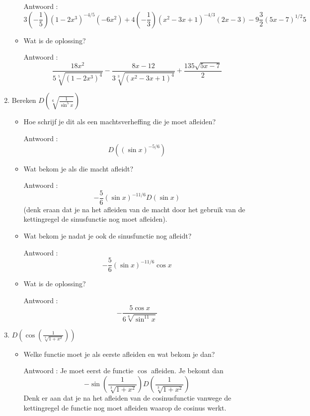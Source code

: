 \begin{enumerate}
\begin{itemize}
		Antwoord : \[3\left(- \frac{1}{5} \right)\left( 1-2x^3  \right)^{-4/5}\left( -6x^2  \right)+4\left( -\frac{1}{3}  \right)\left( x^2-3x+1  \right)^{-4/3}\left(2 x-3  \right)-9\frac{3}{2}\left( 5x-7  \right)^{1/2}5\]
		
		\item Wat is de oplossing?
		
		Antwoord : \[\frac{18x^2}{5\sqrt[5]{\left( 1-2x^3 \right) ^4}}-\frac{8x-12}{3\sqrt[3]{\left( x^2-3x+1 \right)^4}}+\frac{135 \sqrt{5x-7}}{2}\]
		
	\end{itemize}
	
	\item Bereken $D \left( \sqrt[6]{\frac{1}{\sin ^5x}}  \right)$
	
	\begin{itemize}
		
		\item Hoe schrijf je dit als een machtsverheffing die je moet afleiden?
		
		Antwoord : \[D \left( (\sin x)^{-5/6}  \right)\]
		
		\item Wat bekom je als die macht afleidt? 
		
		Antwoord : \[-\frac{5}{6} (\sin x)^{-11/6} D(\sin x)\] (denk eraan dat je na het afleiden van de macht door het gebruik van de kettingregel de sinusfunctie nog moet afleiden).
		
		\item Wat bekom je nadat je ook de sinusfunctie nog afleidt?
		
		Antwoord : \[-\frac{5}{6} (\sin x)^{-11/6} \cos x\]
		
		\item Wat is de oplossing?
		
		Antwoord : \[-\frac{5 \cos x}{6 \sqrt[6]{\sin ^{11}x}}\]
		
	\end{itemize}
	
	\item $D \left( \cos \left( \frac {1}{\sqrt[3]{1+x^2}}  \right)  \right)$
	
	\begin{itemize}
		
		\item Welke functie moet je als eerste afleiden en wat bekom je dan?
		
		Antwoord : Je moet eerst de functie $\cos$ afleiden. Je bekomt dan
		\[
		-\sin \left(  \frac{1}{\sqrt[3]{1+x^2}} \right) D \left(  \frac{1}{\sqrt[3]{1+x^2}} \right) 
		\]
		Denk er aan dat je na het afleiden van de cosinusfunctie vanwege de kettingregel de functie nog moet afleiden waarop de cosinus werkt.
		

\end{itemize}
\end{enumerate}
